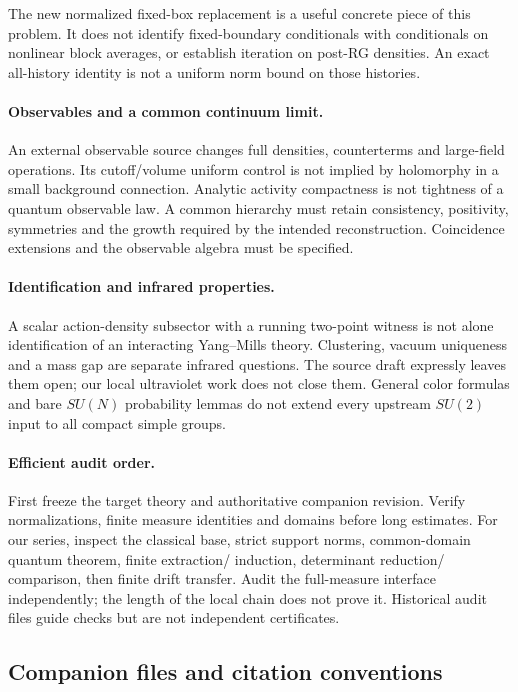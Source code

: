 The new normalized fixed-box
replacement is a useful concrete
piece of this problem. It does
not identify fixed-boundary
conditionals with conditionals
on nonlinear block averages,
or establish iteration on
post-RG densities. An exact
all-history identity is not
a uniform norm bound on
those histories.

\paragraph{Observables and a common
continuum limit.}
An external observable source
changes full densities,
counterterms and large-field
operations. Its cutoff/volume
uniform control is not implied
by holomorphy in a small
background connection.
Analytic activity compactness
is not tightness of a quantum
observable law. A common
hierarchy must retain consistency,
positivity, symmetries and the
growth required by the intended
reconstruction. Coincidence
extensions and the observable
algebra must be specified.

\paragraph{Identification and
infrared properties.}
A scalar action-density subsector
with a running two-point witness
is not alone identification of
an interacting Yang--Mills
theory. Clustering, vacuum
uniqueness and a mass gap are
separate infrared questions.
The source draft expressly
leaves them open; our local
ultraviolet work does not close
them. General color formulas
and bare \(SU(N)\) probability
lemmas do not extend every
upstream \(SU(2)\) input to
all compact simple groups.

\paragraph{Efficient audit order.}
First freeze the target theory
and authoritative companion
revision. Verify normalizations,
finite measure identities and
domains before long estimates.
For our series, inspect the
classical base, strict support
norms, common-domain quantum
theorem, finite extraction/
induction, determinant reduction/
comparison, then finite drift
transfer. Audit the full-measure
interface independently; the
length of the local chain
does not prove it. Historical
audit files guide checks but
are not independent certificates.

\subsection{Companion files and citation conventions}
\label{hrb-companions}

